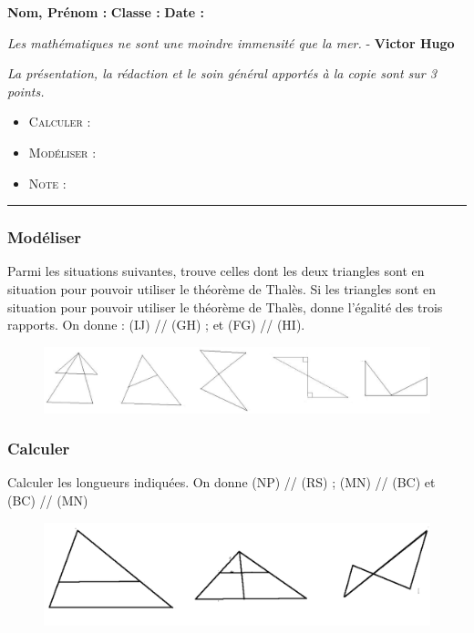 \documentclass[11pt]{article}
\newcommand{\horrule}[1]{\rule{\linewidth}{#1}} %
\begin{document}
\textbf{Nom, Prénom :} \hspace{8cm} \textbf{Classe :} \hspace{3cm} \textbf{Date :}\\


\begin{center}
  \textit{Les mathématiques ne sont une moindre immensité que la mer.}  - \textbf{Victor Hugo}
\end{center}

\textit{La présentation, la rédaction et le soin général apportés à la copie sont sur 3 points.}
\begin{itemize}
\item \textsc{Calculer} : 
\item \textsc{Modéliser} : 
\item \textsc{Note} : 
\end{itemize}

\horrule{1px}
\vspace{-1cm}

\subsubsection*{Modéliser}
Parmi les situations suivantes, trouve celles dont les deux triangles sont en situation
pour pouvoir utiliser le théorème de Thalès. Si les triangles sont en situation pour pouvoir utiliser le théorème de Thalès, donne
l’égalité des trois rapports.
On donne : (IJ) // (GH) ; et (FG) // (HI).

\begin{figure}[H]
  \centering
  \includegraphics[width=0.8\linewidth]{sources/ch5-thales/1_modele.png}
\end{figure}

\subsubsection*{Calculer}

Calculer les longueurs indiquées. On donne (NP) // (RS) ; (MN) // (BC) et (BC) // (MN)

\begin{figure}[H]
  \centering
  \includegraphics[width=0.8\linewidth]{sources/ch5-thales/2_longueurs.png}
\end{figure}
\end{document}
